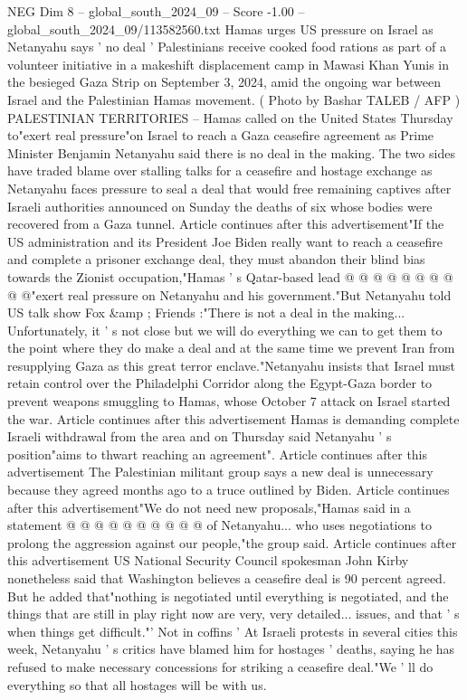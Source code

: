 \begin{textsample}{NEG Dim 8 – global\_south\_2024\_09 – Score -1.00 – global\_south\_2024\_09/113582560.txt}  \label{ex:f8_neg_205}
Hamas urges US pressure on Israel as Netanyahu says ' no deal ' Palestinians receive cooked food rations as part of a volunteer initiative in a makeshift displacement camp in Mawasi Khan Yunis in the besieged Gaza Strip on September 3, 2024, amid the ongoing war between Israel and the Palestinian Hamas movement. ( Photo by Bashar TALEB / AFP ) PALESTINIAN TERRITORIES -- Hamas called on the United States Thursday to"exert real pressure"on Israel to reach a Gaza ceasefire agreement as Prime Minister Benjamin Netanyahu said there is no deal in the making.
The two sides have traded blame over stalling talks for a ceasefire and hostage exchange as Netanyahu faces pressure to seal a deal that would free remaining captives after Israeli authorities announced on Sunday the deaths of six whose bodies were recovered from a Gaza tunnel.
Article continues after this advertisement"If the US administration and its President Joe Biden really want to reach a ceasefire and complete a prisoner exchange deal, they must abandon their blind bias towards the Zionist occupation,"Hamas ' s Qatar-based lead @ @ @ @ @ @ @ @ @ @"exert real pressure on Netanyahu and his government."But Netanyahu told US talk show Fox \&amp ; Friends :"There is not a deal in the making...
Unfortunately, it ' s not close but we will do everything we can to get them to the point where they do make a deal and at the same time we prevent Iran from resupplying Gaza as this great terror enclave."Netanyahu insists that Israel must retain control over the Philadelphi Corridor along the Egypt-Gaza border to prevent weapons smuggling to Hamas, whose October 7 attack on Israel started the war.
Article continues after this advertisement Hamas is demanding complete Israeli withdrawal from the area and on Thursday said Netanyahu ' s position"aims to thwart reaching an agreement".
Article continues after this advertisement The Palestinian militant group says a new deal is unnecessary because they agreed months ago to a truce outlined by Biden.
Article continues after this advertisement"We do not need new proposals,"Hamas said in a statement @ @ @ @ @ @ @ @ @ @ of Netanyahu... who uses negotiations to prolong the aggression against our people,"the group said.
Article continues after this advertisement US National Security Council spokesman John Kirby nonetheless said that Washington believes a ceasefire deal is 90 percent agreed.
But he added that"nothing is negotiated until everything is negotiated, and the things that are still in play right now are very, very detailed... issues, and that ' s when things get difficult."' Not in coffins ' At Israeli protests in several cities this week, Netanyahu ' s critics have blamed him for hostages ' deaths, saying he has refused to make necessary concessions for striking a ceasefire deal."We ' ll do everything so that all hostages will be with us.

\end{textsample}

